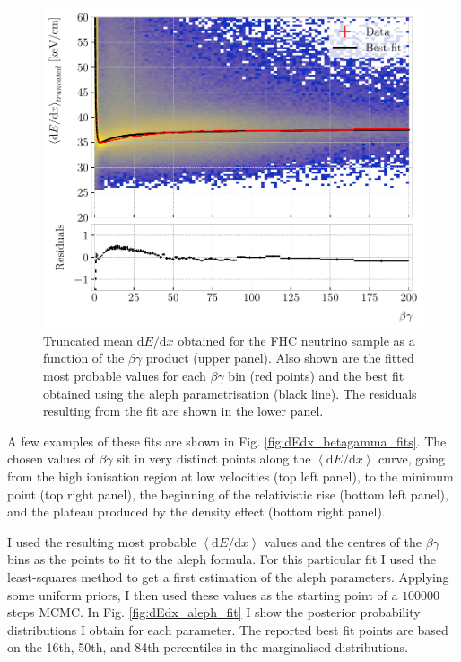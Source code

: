 \begin{figure}[t]
	\centering
	\includegraphics[width=.85\linewidth]{Images/GArSoft_PID/dEdx/dEdx_aleph_data_with_fit.pdf}
	\caption[Truncated mean $\mathrm{d}E/\mathrm{d}x$ obtained for the FHC neutrino sample as a function of the $\beta\gamma$ product, together with the fitted most probable values for each $\beta\gamma$ bin and the best fit obtained using the \gls{aleph} parametrisation.]{Truncated mean $\mathrm{d}E/\mathrm{d}x$ obtained for the FHC neutrino sample as a function of the $\beta\gamma$ product (upper panel). Also shown are the fitted most probable values for each $\beta\gamma$ bin (red points) and the best fit obtained using the \gls{aleph} parametrisation (black line). The residuals resulting from the fit are shown in the lower panel.}
	\label{fig:dEdx_betagamma_aleph}
\end{figure}

A few examples of these fits are shown in Fig. \ref{fig:dEdx_betagamma_fits}. The chosen values of $\beta\gamma$ sit in very distinct points along the $\left<\mathrm{d}E/\mathrm{d}x\right>$ curve, going from the high ionisation region at low velocities (top left panel), to the minimum point (top right panel), the beginning of the relativistic rise (bottom left panel), and the plateau produced by the density effect (bottom right panel).

I used the resulting most probable $\left<\mathrm{d}E/\mathrm{d}x\right>$ values and the centres of the $\beta\gamma$ bins as the points to fit to the \gls{aleph} formula. For this particular fit I used the least-squares method to get a first estimation of the \gls{aleph} parameters. Applying some uniform priors, I then used these values as the starting point of a $100000$ steps MCMC. In Fig. \ref{fig:dEdx_aleph_fit} I show the posterior probability distributions I obtain for each parameter. The reported best fit points are based on the 16th, 50th, and 84th percentiles in the marginalised distributions.

